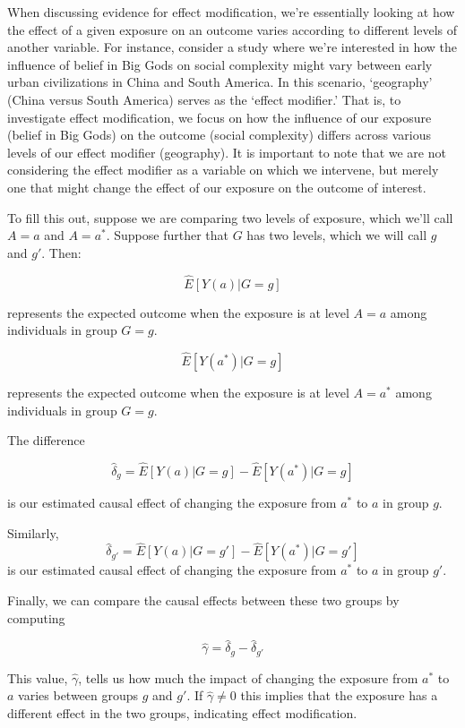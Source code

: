 \documentclass[
  singlecolumn]{report}
\begin{document}
When discussing evidence for effect modification, we're essentially
looking at how the effect of a given exposure on an outcome varies
according to different levels of another variable. For instance,
consider a study where we're interested in how the influence of belief
in Big Gods on social complexity might vary between early urban
civilizations in China and South America. In this scenario, `geography'
(China versus South America) serves as the `effect modifier.' That is,
to investigate effect modification, we focus on how the influence of our
exposure (belief in Big Gods) on the outcome (social complexity) differs
across various levels of our effect modifier (geography). It is
important to note that we are not considering the effect modifier as a
variable on which we intervene, but merely one that might change the
effect of our exposure on the outcome of interest.

To fill this out, suppose we are comparing two levels of exposure, which
we'll call \(A = a\) and \(A= a^*\). Suppose further that \(G\) has two
levels, which we will call \(g\) and \(g'\). Then:

\[\hat{E}[Y(a)|G=g]\]

represents the expected outcome when the exposure is at level \(A=a\)
among individuals in group \(G=g\).

\[\hat{E}[Y(a^*)|G=g]\]

represents the expected outcome when the exposure is at level \(A=a^*\)
among individuals in group \(G=g\).

The difference

\[\hat{\delta}_g = \hat{E}[Y(a)|G=g] - \hat{E}[Y(a^*)|G=g]\]

is our estimated causal effect of changing the exposure from \(a^*\) to
\(a\) in group \(g\).

Similarly,
\[\hat{\delta}_{g'} = \hat{E}[Y(a)|G=g'] - \hat{E}[Y(a^*)|G=g']\] is our
estimated causal effect of changing the exposure from \(a^*\) to \(a\)
in group \(g'\).

Finally, we can compare the causal effects between these two groups by
computing

\[\hat{\gamma} = \hat{\delta}_g - \hat{\delta}_{g'}\]

This value, \(\hat{\gamma}\), tells us how much the impact of changing
the exposure from \(a^*\) to \(a\) varies between groups \(g\) and
\(g'\). If \(\hat{\gamma}\neq 0\) this implies that the exposure has a
different effect in the two groups, indicating effect modification.
\end{document}

